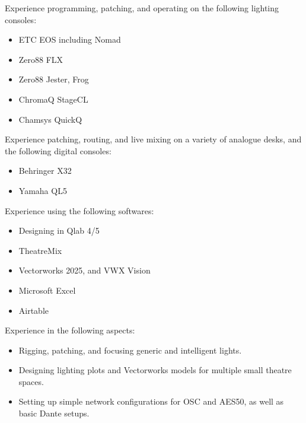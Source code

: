 \documentclass[../../cv-cs.tex]{subfiles}
\begin{document}
\vspace{-8pt}

Experience programming, patching, and operating on the following lighting consoles:
\begin{itemize}
	\item ETC EOS including Nomad
	\item Zero88 FLX
	\item Zero88 Jester, Frog
	\item ChromaQ StageCL
	\item Chamsys QuickQ
\end{itemize}


Experience patching, routing, and live mixing on a variety of analogue desks, and the following digital consoles:
\begin{itemize}
	\item Behringer X32
	\item Yamaha QL5
\end{itemize}


Experience using the following softwares:
\begin{itemize}
	\item Designing in Qlab 4/5
	\item TheatreMix
	\item Vectorworks 2025, and VWX Vision
	\item Microsoft Excel
	\item Airtable
\end{itemize}


Experience in the following aspects:
\begin{itemize}
	\item Rigging, patching, and focusing generic and intelligent lights.
	\item Designing lighting plots and Vectorworks models for multiple small theatre spaces.
	\item Setting up simple network configurations for OSC and AES50, as well as basic Dante setups.
\end{itemize}
\end{document}
